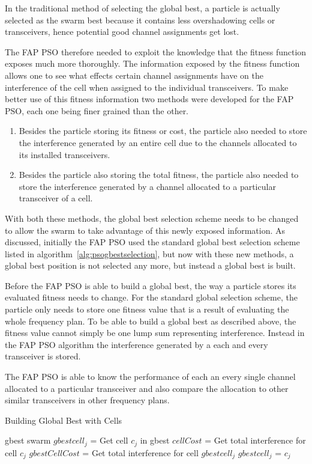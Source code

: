 In the traditional method of selecting the global best, a particle is actually selected as the swarm best because it contains less overshadowing cells or transceivers, hence potential good channel assignments get lost.

The FAP PSO therefore needed to exploit the knowledge that the fitness function exposes much more thoroughly. The information exposed by the fitness function allows one to see what effects certain channel assignments have on the interference of the cell when assigned to the individual transceivers. To make better use of this fitness information two methods were developed for the FAP PSO, each one being finer grained than the other.

\begin{enumerate}
\item Besides the particle storing its fitness or cost, the particle also needed to store the interference generated by an entire cell due to the channels allocated to its installed transceivers.
\item Besides the particle also storing the total fitness, the particle also needed to store the interference generated by a channel allocated to a particular transceiver of a cell.
\end{enumerate}

With both these methods, the global best selection scheme needs to be changed to allow the swarm to take advantage of this newly exposed information. As discussed, initially the FAP PSO used the standard global best selection scheme listed in algorithm~\ref{alg:psogbestselection}, but now with these new methods, a global best position is not selected any more, but instead a global best is built.

Before the FAP PSO is able to build a global best, the way a particle stores its evaluated fitness needs to change. For the standard global selection scheme, the particle only needs to store one fitness value that is a result of evaluating the whole frequency plan. To be able to build a global best as described above, the fitness value cannot simply be one lump sum representing interference. Instead in the FAP PSO algorithm the interference generated by a each and every transceiver is stored.

The FAP PSO is able to know the performance of each an every single channel allocated to a particular transceiver and also compare the allocation to other similar transceivers in other frequency plans.

\begin{algorithm}
\caption{Building Global Best with Cells}
\label{alg:gbestcells}
\begin{algorithmic}[1]
\REQUIRE gbest
\REQUIRE swarm
		\STATE $gbestcell_j$ = Get cell $c_j$ in gbest
		\STATE $cellCost$ = Get total interference for cell $c_j$
		\STATE $gbestCellCost$ = Get total interference for cell $gbestcell_j$
			\STATE $gbestcell_j$ = $c_j$
		\ENDIF
	\ENDFOR
\ENDFOR
\end{algorithmic}
\end{algorithm}

